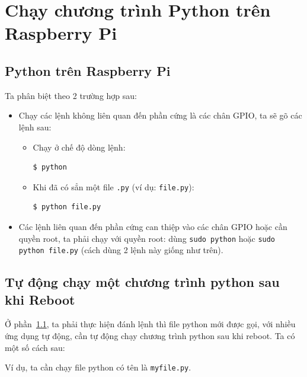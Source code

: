 \chapter{Chạy chương trình Python trên Raspberry Pi}
\section{Python trên Raspberry Pi}\label{run-python}
Ta phân biệt theo 2 trường hợp sau:
\begin{itemize}
\item Chạy các lệnh không liên quan đến phần cứng là các chân GPIO, ta sẽ gõ các lệnh sau:
\begin{itemize}
\item Chạy ở chế độ dòng lệnh:
\begin{lstlisting}[language=bash]
$ python
\end{lstlisting}
\item Khi đã có sẳn một file \verb|.py| (ví dụ: \verb|file.py|):
\begin{lstlisting}[language=bash]
$ python file.py
\end{lstlisting}
\end{itemize}
\item Các lệnh liên quan đến phần cứng can thiệp vào các chân GPIO hoặc cần quyền root, ta phải chạy với quyền root: dùng \verb|sudo python| hoặc \verb|sudo python file.py| (cách dùng 2 lệnh này giống như trên).
\end{itemize}
\section{Tự động chạy một chương trình python sau khi Reboot}
Ở phần~\ref{run-python}, ta phải thực hiện đánh lệnh thì file python mới được gọi, với nhiều ứng dụng tự động, cần tự động chạy chương trình python sau khi reboot. Ta có một số cách sau:

Ví dụ, ta cần chạy file python có tên là \verb|myfile.py|.
